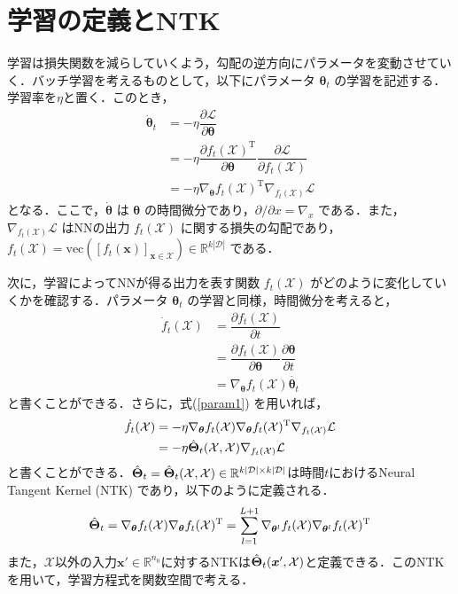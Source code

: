 \section{学習の定義とNTK}
\label{learning_def_NTK}
学習は損失関数を減らしていくよう，勾配の逆方向にパラメータを変動させていく．バッチ学習を考えるものとして，以下にパラメータ $\bm{\theta}_t$ の学習を記述する．学習率を$\eta$と置く．このとき，
\begin{align}
    \dot{\bm{\theta}}_t &= -\eta \dfrac{\partial \mathcal{L}}{\partial \bm{\theta}} \\
    &= -\eta \dfrac{\partial f_t(\mathcal{X})^{\mathrm{T}}}{\partial \bm{\theta}} \dfrac{\partial \mathcal{L}}{\partial f_t(\mathcal{X})} \\
    &= -\eta \nabla_{\bm{\theta}}f_t(\mathcal{X})^{\mathrm{T}}\nabla_{f_t(\mathcal{X})}\mathcal{L} \label{param1}
\end{align}
となる．ここで，$\dot{\bm{\theta}}$ は $\bm{\theta}$ の時間微分であり，$\partial/\partial x = \nabla_x$ である．また，$\nabla_{f_t(\mathcal{X})}\mathcal{L}$ はNNの出力 $f_t(\mathcal{X})$ に関する損失の勾配であり，$f_t(\mathcal{X}) = \mbox{vec}([f_t(\bm{x})]_{\bm{x} \in \mathcal{X}}) \in \mathbb{R}^{k|\mathcal{D}|}$ である．

次に，学習によってNNが得る出力を表す関数 $f_t(\mathcal{X})$ がどのように変化していくかを確認する．パラメータ $\bm{\theta}_t$ の学習と同様，時間微分を考えると，
\begin{align}
    \dot{f}_t(\mathcal{X}) &= \dfrac{\partial f_t(\mathcal{X})}{\partial t} \\
    &= \dfrac{\partial f_t(\mathcal{X})}{\partial \bm{\theta}} \dfrac{\partial \bm{\theta}}{\partial t} \\
    &= \nabla_{\bm{\theta}}f_t(\mathcal{X})\dot{\bm{\theta}_t}
\end{align}
と書くことができる．さらに，式(\ref{param1}) を用いれば，
\begin{align}
    \dot{f}_t(\mathcal{X}) &=  -\eta\nabla_{\bm{\theta}}f_t(\mathcal{X})\nabla_{\bm{\theta}}f_t(\mathcal{X})^{\mathrm{T}}\nabla_{f_t(\mathcal{X})}\mathcal{L} \\
    &= -\eta\hat{\bm{\Theta}}_t(\mathcal{X}, \mathcal{X})\nabla_{f_t(\mathcal{X})}\mathcal{L} \label{func_learning}
\end{align}
と書くことができる．$\hat{\bm{\Theta}}_t = \hat{\bm{\Theta}}_t(\mathcal{X}, \mathcal{X}) \in \mathbb{R}^{k|\mathcal{D}| \times k|\mathcal{D}|}$は時間$t$におけるNeural Tangent Kernel (NTK) であり，以下のように定義される．
\begin{align}
    \hat{\bm{\Theta}}_t = \nabla_{\bm{\theta}}f_t(\mathcal{X})\nabla_{\bm{\theta}}f_t(\mathcal{X})^{\mathrm{T}} = \sum_{l=1}^{L+1} \nabla_{\bm{\theta}^l}f_t(\mathcal{X})\nabla_{\bm{\theta}^l}f_t(\mathcal{X})^{\mathrm{T}}
\end{align}
また，$\mathcal{X}$以外の入力$\bm{x}' \in \mathbb{R}^{n_0}$に対するNTKは$\hat{\bm{\Theta}}_t(\bm{x}', \mathcal{X})$と定義できる．このNTKを用いて，学習方程式を関数空間で考える．

